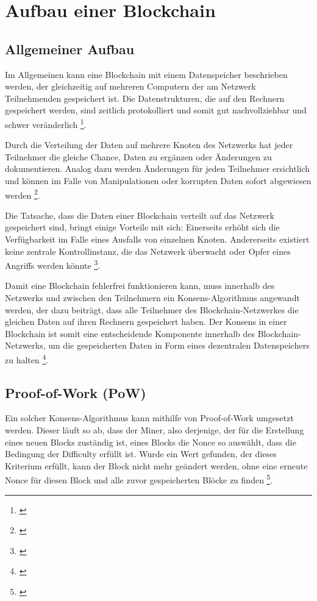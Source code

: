 \chapter{Aufbau einer Blockchain}\label{chp:aufbau-einer-blockchain}

\section{Allgemeiner Aufbau}\label{sec:allgemeiner-aufbau}
Im Allgemeinen kann eine Blockchain mit einem Datenspeicher beschrieben werden, der gleichzeitig auf mehreren Computern der am Netzwerk Teilnehmenden gespeichert ist. Die Datenstrukturen, die auf den Rechnern gespeichert werden, sind zeitlich protokolliert und somit gut nachvollziehbar und schwer veränderlich \footnote{\parencite[vgl.][]{BaFin.25.10.2021}}.

Durch die Verteilung der Daten auf mehrere Knoten des Netzwerks hat jeder Teilnehmer die gleiche Chance, Daten zu ergänzen oder Änderungen zu dokumentieren. Analog dazu werden Änderungen für jeden Teilnehmer ersichtlich und können im Falle von Manipulationen oder korrupten Daten sofort abgewiesen werden \footnote{\parencite[vgl][]{BaFin.25.10.2021}}.

Die Tatsache, dass die Daten einer Blockchain verteilt auf das Netzwerk gespeichert sind, bringt einige Vorteile mit sich: Einerseits erhöht sich die Verfügbarkeit im Falle eines Ausfalls von einzelnen Knoten. Andererseits existiert keine zentrale Kontrollinstanz, die das Netzwerk überwacht oder Opfer eines Angriffs werden könnte \footnote{\parencite[vgl][]{BaFin.25.10.2021}}.

Damit eine Blockchain fehlerfrei funktionieren kann, muss innerhalb des Netzwerks und zwischen den Teilnehmern ein Konsens-Algorithmus angewandt werden, der dazu beiträgt, dass alle Teilnehmer des Blockchain-Netzwerkes die gleichen Daten auf ihren Rechnern gespeichert haben. Der Konsens in einer Blockchain ist somit eine entscheidende Komponente innerhalb des Blockchain-Netzwerks, um die gespeicherten Daten in Form eines dezentralen Datenspeichers zu halten \footnote{\parencite[vgl.][S. 5]{Raikwar.2019}}. 

\section{Proof-of-Work (PoW)}\label{sec:proof-of-work}
Ein solcher Konsens-Algorithmus kann mithilfe von Proof-of-Work umgesetzt werden. Dieser läuft so ab, dass der Miner, also derjenige, der für die Erstellung eines neuen Blocks zuständig ist, eines Blocks die Nonce so auswählt, dass die Bedingung der Difficulty erfüllt ist. Wurde ein Wert gefunden, der dieses Kriterium erfüllt, kann der Block nicht mehr geändert werden, ohne eine erneute Nonce für diesen Block und alle zuvor gespeicherten Blöcke zu finden \footnote{\parencite[vgl.][S. 1546]{Bach.52018}}.


